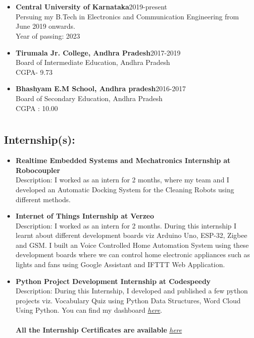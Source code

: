 \documentclass[]{article}
\begin{document}
\section*{\color{blue}{Education}}%
    \begin{itemize}
        \item \textbf{Central University of Karnataka}\hspace{7.1cm}2019-present\\Persuing my B.Tech in Electronics and Communication Engineering from June 2019 onwards.\\Year of passing: 2023
        \item \textbf{Tirumala Jr. College, Andhra Pradesh}\hspace{6.3cm}2017-2019\\Board of Intermediate Education, Andhra Pradesh\\CGPA- 9.73
        \item \textbf{Bhashyam E.M School, Andhra pradesh}\hspace{6cm}2016-2017\\Board of Secondary Education, Andhra Pradesh\\CGPA : 10.00
    \end{itemize} 
\section*{\color{blue}{Experience}}%
    \subsection*{Internship(s):}
    \begin{itemize}
    \item \textbf{Realtime Embedded Systems and Mechatronics Internship at Robocoupler}\\Description: I worked as an intern for 2 months, where my team and I developed an Automatic Docking System for the Cleaning Robots using different methods. 
	\item \textbf{Internet of Things Internship at Verzeo}\\Description: I worked as an intern for 2 months. During this internship I learnt about different development boards viz Arduino Uno, ESP-32, Zigbee and GSM. I built an Voice Controlled Home Automation System using these development boards where we can control home electronic appliances such as lights and fans using Google Assistant and IFTTT Web Application.
    	\item \textbf{Python Project Development Internship at Codespeedy} \\ Description: During this Internship, I developed and published a few python projects viz. Vocabulary Quiz using Python Data Structures, Word Cloud Using Python. You can find my dashboard \href{https://coderspacket.com/contributor/vempatisridharbzy}{\em here}.\\ \\
\textbf{All the Internship Certificates are available }\href{https://drive.google.com/drive/u/0/folders/1X2hJOIpAaPBdThqYgYWMJrkt0Hddwq_q}{\em here}
    \end{itemize}
    \newpage
\end{document}
